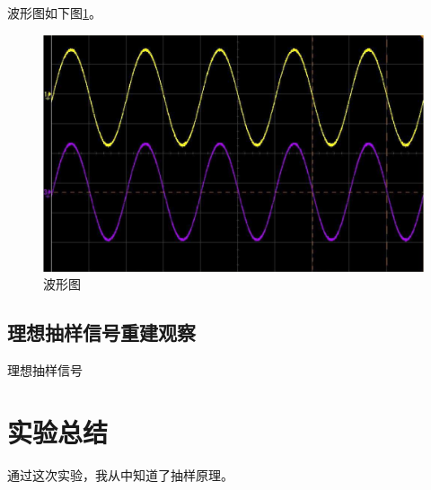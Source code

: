 \documentclass[UTF8,AutoFakeBold,AutoFakeSlant,12pt]{ctexart}
\begin{document}
波形图如下图\ref{波形图}。

\begin{figure}[htbp] %
  \centering %
  \includegraphics[width= .8\textwidth]{p1.jpg} %
  \caption{波形图}\label{波形图} %
\end{figure}

\subsection{理想抽样信号重建观察}
理想抽样信号

\section{实验总结}
通过这次实验，我从中知道了抽样原理。
\end{document}
